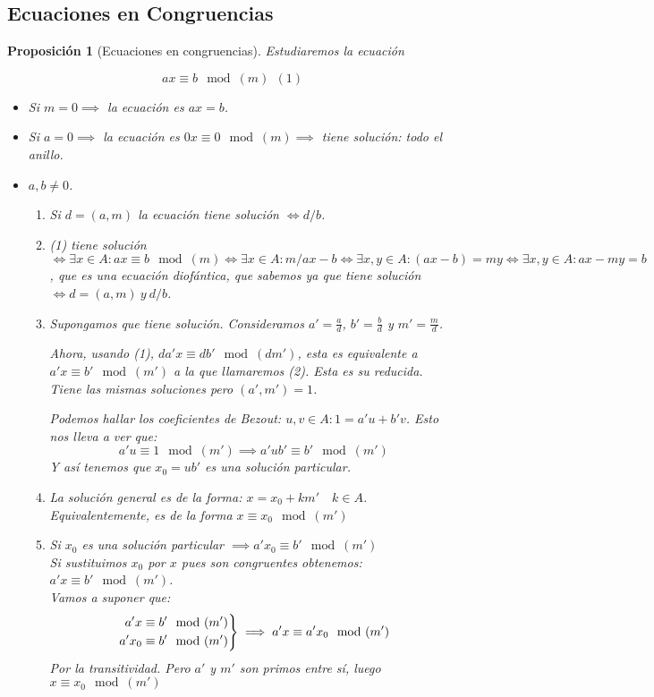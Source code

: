 \documentclass[11pt, a4paper, titlepage]{article}
\makeatletter
\renewenvironment{proof}[1][\proofname] {\vspace{-15pt}\par\pushQED{\qed}\normalfont\topsep6\p@\@plus6\p@\relax\trivlist\item[\hskip\labelsep\it#1\@addpunct{.}]\ignorespaces}{\popQED\endtrivlist\@endpefalse}
\theoremstyle{theorem-style}
\newtheorem*{nprop}{Proposición}
\theoremstyle{definition-style}
\theoremstyle{remark-style}
\theoremstyle{example-style}
\newenvironment{rcases}
  {\left.\begin{aligned}}
  {\end{aligned}\right\rbrace}
\makeatother
\begin{document}
\subsection{Ecuaciones en Congruencias}
\begin{nprop}[Ecuaciones en congruencias]

  Estudiaremos la ecuación

  $$ax \equiv b \mod(m) \  \ (1)$$
  
\begin{itemize}
	\item Si $m = 0 \implies$ la ecuación es $ax = b$.
	\item Si $a = 0\implies $ la ecuación es $0x \equiv 0 \mod(m) \implies$ tiene solución: todo el anillo.
	\item $a,b \ne 0$.
	\begin{enumerate}
	
	\item Si $d = (a,m)$ la ecuación tiene solución $\iff  d/b$. \\
        \begin{proof}
	(1) tiene solución $\iff \exists x \in A : ax \equiv b\mod(m) \iff \exists x \in A : m/ax-b \iff \exists x,y \in A : (ax-b) = my \iff \exists x,y \in A: ax -my  = b$, que es una ecuación diofántica, que sabemos ya que tiene solución $\iff d =(a,m) \ y  \ d/b$.
\end{proof}
	\item  Supongamos que tiene solución. Consideramos $a'= \frac{a}{d}$, $b'= \frac{b}{d}$ y $m' = \frac{m}{d}$.
	
	Ahora, usando (1), $da'x \equiv db'\mod(dm')$, esta es equivalente a $a'x \equiv b' \mod(m')$ a la que llamaremos (2). Esta es su reducida. Tiene las mismas soluciones pero $(a',m') = 1$.
	
	Podemos hallar los coeficientes de Bezout: $u,v \in A :  1 = a'u + b'v$. Esto nos lleva a ver que:
	\[
	a'u \equiv 1 \mod(m') \implies a'ub' \equiv b' \mod(m')
	\]
	Y así tenemos que $x_0 = ub'$ es una solución particular.
	
	\item La solución general es de la forma: $x = x_0 +km' \quad k \in A$. Equivalentemente, es de la forma $x \equiv x_0 \mod(m')$\\
	\begin{proof}
	Si $x_0$ es una solución particular $\implies a'x_0 \equiv b'\mod(m')$\\
	Si sustituimos $x_0$ por $x$ pues son congruentes obtenemos: $a'x \equiv b' \mod(m')$.\\
	Vamos a suponer que:
	\[
	\begin{rcases}
	a'x \equiv b' \mod(m')\\
	a' x_0 \equiv b' \mod(m')
\end{rcases} \implies a'x \equiv a'x_0 \mod(m')
	\]
Por la transitividad. Pero $a'$ y $m'$ son primos entre sí, luego $x \equiv x_0 \mod(m')$
\end{proof}


\end{enumerate}
\end{itemize}
\end{nprop}
\end{document}
